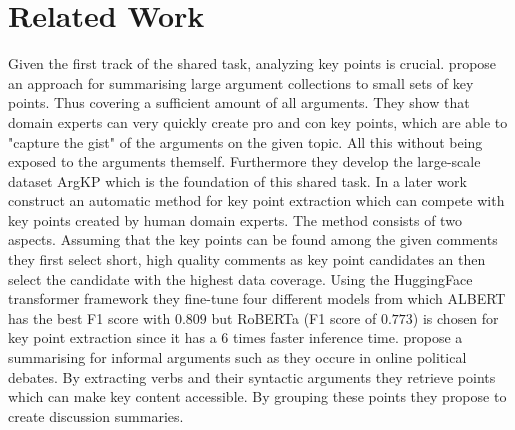 \section{Related Work}\label{related-work}


Given the first track of the shared task, analyzing key points is crucial.  
\citet{Bar-HaimEFKLS2020} propose an approach for summarising large argument collections to small sets of key points. Thus
covering a sufficient amount of all arguments. They show that domain experts can very quickly
create pro and con key points, which are able to "capture the gist" of the arguments on the given topic. All this
without being exposed to the arguments themself. Furthermore they develop the large-scale dataset ArgKP
which is the foundation of this shared task. 
In a later work \citet{Bar-HaimKEFLS2020} construct an automatic method for key point 
extraction which can compete with key points created by human domain experts. The method consists of two aspects. 
Assuming that the key points can be found among the given comments 
they first select short, high quality comments as key point candidates an then select the candidate with the highest
data coverage. Using the HuggingFace transformer framework they fine-tune four different models from which 
ALBERT \cite{lan2019albert} has the best F1 score with $0.809$ but RoBERTa \cite{LiuOGDJCLLZS2019} (F1 score of 
$0.773$) is chosen for key point extraction since it has a 6 times faster inference time. 
\citet{egan2016summarising} propose a summarising for informal arguments such as they
occure in online political debates. By extracting verbs and their syntactic arguments they retrieve points which
can make key content accessible. By grouping these points they propose to create discussion summaries.

